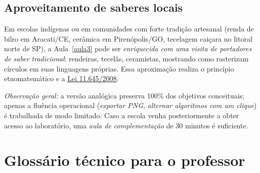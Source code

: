 \documentclass[12pt,a4paper]{scrartcl}
\begin{document}
\subsection{Aproveitamento de saberes locais}
Em escolas indígenas ou em comunidades com forte tradição artesanal (renda de bilro em Aracati/CE, cerâmica em Pirenópolis/GO, tecelagem caiçara no litoral norte de SP), a Aula~\ref{aula3} pode ser \emph{enriquecida com uma visita de portadores de saber tradicional}: rendeiras, tecelãs, ceramistas, mostrando como rasterizam círculos em suas linguagens próprias. Essa aproximação realiza o princípio etnomatemático e a \href{https://www.planalto.gov.br/ccivil_03/_ato2007-2010/2008/lei/l11645.htm}{Lei 11.645/2008}.

\textit{Observação geral:} a versão analógica preserva 100\% dos objetivos conceituais; apenas a fluência operacional (\emph{exportar PNG}, \emph{alternar algoritmos com um clique}) é trabalhada de modo limitado. Caso a escola venha posteriormente a obter acesso ao laboratório, uma \emph{aula de complementação} de 30 minutos é suficiente.

\newpage
\section{Glossário técnico para o professor}\label{ap:glos}
\end{document}
